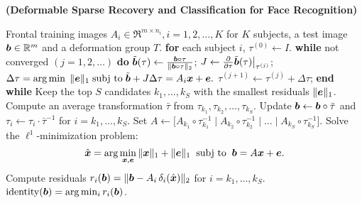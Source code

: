 \documentclass[10pt,twocolumn,letterpaper]{article}
\begin{document}
\begin{algorithm}[thb]
\caption{\bf (Deformable Sparse Recovery and Classification for
Face Recognition)} \label{alg:deformable-src}
\begin{algorithmic}[1]
 Frontal training images $A_i \in \Re^{m\times n_i}, i=1,2,\ldots,K$ for $K$ subjects,  a test image
$\boldsymbol{b}\in\mathbb R^m$ and a deformation group $T$. 
\STATE
{\bf for} each subject $i$, 
\STATE \hspace{3mm} $\tau^{(0)}
\leftarrow I$. 
\STATE \hspace{3mm} {\bf while} not converged $(j=1,2,\ldots)$ {\bf do} 
\STATE \hspace{6mm}
$\tilde {\boldsymbol{b}}(\tau) \leftarrow \frac{\boldsymbol{b} \circ \tau}{\|\boldsymbol{b} \circ
\tau\|_2}$; \;\;\; $J \leftarrow  \frac{\partial}{\partial
\tau} \tilde{\boldsymbol{b}}(\tau)  \bigr|_{\tau^{(j)}} $;
\STATE \hspace{6mm} $ \Delta \tau =  \arg\min \; \| \boldsymbol{e} \|_1  \;
\textup{subj to} \; \tilde {\boldsymbol{b}} + J \Delta \tau = A_i {\boldsymbol{x}} + \boldsymbol{e}.$ 
\STATE
\hspace{6mm} $\tau^{(j+1)} \leftarrow \tau^{(j)} + \Delta
\tau$; 
\STATE \hspace{3mm} {\bf end while}  \STATE Keep
the top $S$ candidates $k_1, \ldots, k_S$ with the smallest
residuals $\|\boldsymbol{e}\|_1$. \STATE Compute an average transformation
$\bar{\tau}$ from $\tau_{k_1}, \tau_{k_2}, \ldots, \tau_{k_S}$.
\STATE Update $\boldsymbol{b} \leftarrow \boldsymbol{b} \circ \bar{\tau}$ and $\tau_i
\leftarrow \tau_i \cdot \bar{\tau}^{-1}$ for $i = k_1, \dots,
k_S$. \STATE Set $A \leftarrow \big[ A_{k_1} \circ
\tau_{k_1}^{-1} \mid A_{k_2} \circ \tau_{k_2}^{-1} \mid \dots
\mid A_{k_S} \circ \tau_{k_S}^{-1} \big]$. \STATE Solve the
$\ell^1$-minimization problem:
$$\hat{{\boldsymbol{x}}} = \arg \min_{{\boldsymbol{x}}, \boldsymbol{e}} \| {\boldsymbol{x}} \|_1 + \|\boldsymbol{e}\|_1 \;\; \textup{subj to} \;\; \boldsymbol{b} = A {\boldsymbol{x}} + \boldsymbol{e}.$$
\STATE Compute residuals $r_i(\boldsymbol{b}) = \| {\boldsymbol{b}} - {A}_i \, \delta_i(\hat{{\boldsymbol{x}}}) \|_2$ for $i = k_1, \dots, k_S$.
 $\mbox{identity}(\boldsymbol{b}) = \arg\min_i r_i(\boldsymbol{b})$.
\end{algorithmic}
\end{algorithm}
\end{document}
